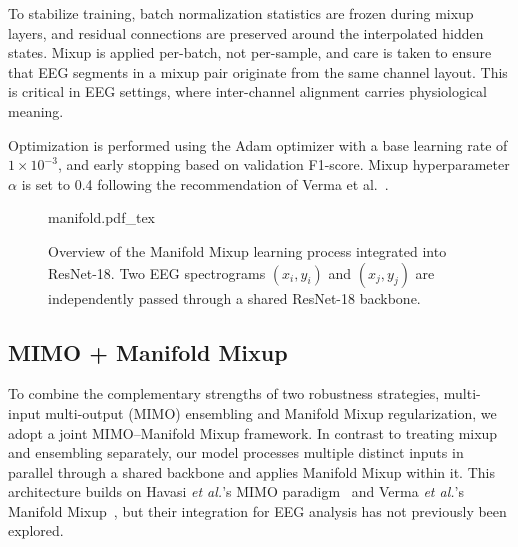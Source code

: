 To stabilize training, batch normalization statistics are frozen during mixup layers, and residual connections are preserved around the interpolated hidden states. Mixup is applied per-batch, not per-sample, and care is taken to ensure that EEG segments in a mixup pair originate from the same channel layout. This is critical in EEG settings, where inter-channel alignment carries physiological meaning.

Optimization is performed using the Adam optimizer with a base learning rate of \(1 \times 10^{-3}\), and early stopping based on validation F1-score. Mixup hyperparameter \(\alpha\) is set to 0.4 following the recommendation of Verma et al.~\cite{manifoldmixup}.
\begin{figure}[h!]
	\centering
    \def\svgwidth{300pt}
 	{manifold.pdf_tex} 	 	
	\caption[Overview of the Manifold Mixup learning process integrated into ResNet-18]{Overview of the Manifold Mixup learning process integrated into ResNet-18. Two EEG spectrograms \((x_i, y_i)\) and \((x_j, y_j)\) are independently passed through a shared ResNet-18 backbone.}
	\label{fig:manifoldmixup}
\end{figure}


\subsection{MIMO + Manifold Mixup}

To combine the complementary strengths of two robustness strategies, multi-input multi-output (MIMO) ensembling and Manifold Mixup regularization, we adopt a joint MIMO–Manifold Mixup framework.  In contrast to treating mixup and ensembling separately, our model processes multiple distinct inputs in parallel through a shared backbone and applies Manifold Mixup within it.  This architecture builds on Havasi \emph{et al.}’s MIMO paradigm~\cite{modelMIMO} and Verma \emph{et al.}’s Manifold Mixup~\cite{manifoldmixup}, but their integration for EEG analysis has not previously been explored.

